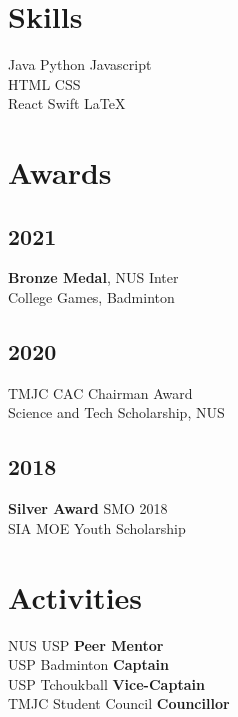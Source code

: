 \documentclass[]{deedy-resume-openfont}
\begin{document}
\begin{minipage}[t]{0.33\textwidth}

\section{Skills}
\textbullet{} Java \textbullet{} Python \textbullet{} Javascript \\
\textbullet{} HTML \textbullet{} CSS \\ 
\textbullet{} React \textbullet{} Swift \textbullet{} \LaTeX\ \\
\sectionsep


\section{Awards}
\subsection{2021} 
\textbf{Bronze Medal}, NUS Inter \\ 
College Games, Badminton \\
\sectionsep
\subsection{2020} 
TMJC CAC Chairman Award \\
Science and Tech Scholarship, NUS \\
\sectionsep
\subsection{2018}
\textbf{Silver Award} SMO 2018 \\
SIA MOE Youth Scholarship \\
\sectionsep


\section{Activities}
NUS USP \textbf{Peer Mentor} \\
USP Badminton \textbf{Captain} \\
USP Tchoukball \textbf{Vice-Captain} \\
TMJC Student Council \textbf{Councillor} \\
\sectionsep

%
%

\end{minipage} 
\end{document}
